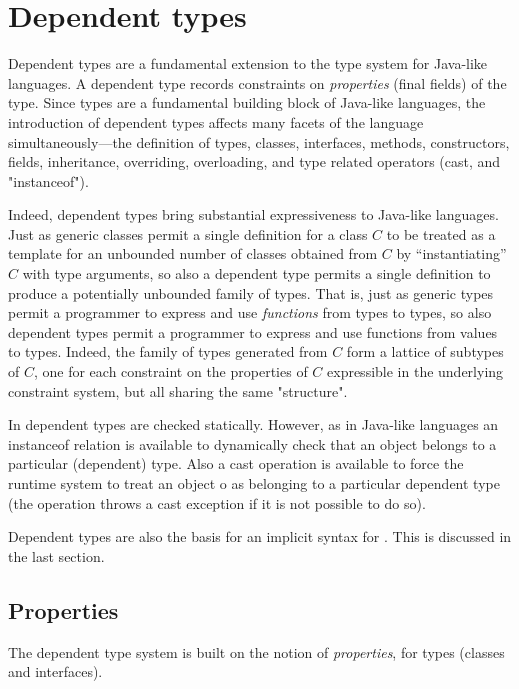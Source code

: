 \chapter{Dependent types}\label{XtenDepTypes}
\def\withmath#1{\relax\ifmmode#1\else{$#1$}\fi}
\def\LL#1{\withmath{\lbrack\!\lbrack #1\rbrack\!\rbrack}}

Dependent types are a fundamental extension to the type system for
Java-like languages. A dependent type records constraints on
{\em properties} (final fields) of the type.  Since types are a fundamental
building block of Java-like languages, the introduction of dependent
types affects many facets of the language simultaneously---the
definition of types, classes, interfaces, methods, constructors,
fields, inheritance, overriding, overloading, and type related
operators (cast, and \xcd"instanceof").

Indeed, dependent types bring substantial expressiveness to Java-like
languages. Just as generic classes permit a single definition for a
class $C$ to be treated as a template for an unbounded number of classes
obtained from $C$ by ``instantiating'' $C$ with type arguments, so also a
dependent type permits a single definition to produce a potentially
unbounded family of types. That is, just as generic types permit a
programmer to express and use {\em functions} from types to types, so also
dependent types permit a programmer to express and use functions from values
to types.  Indeed, the family of types generated from $C$ form a
lattice of subtypes of $C$, one for each constraint on the properties
of $C$ expressible in the underlying constraint system, but all sharing
the same "structure".

In \Xten{} dependent types are checked statically. However, as in
Java-like languages an instanceof relation is available to dynamically
check that an object belongs to a particular (dependent) type. Also a
cast operation is available to force the runtime system to treat an
object o as belonging to a particular dependent type (the operation
throws a cast exception if it is not possible to do so).

Dependent types are also the basis for an implicit syntax for
\Xten{}. This is discussed in the last section.

\section{Properties}\label{DepType:Properties}
The dependent type system is built on the notion of {\em properties}, 
for types (classes and interfaces).

